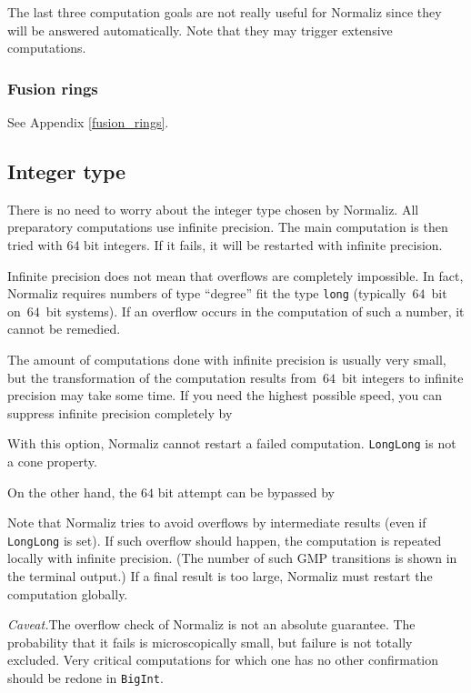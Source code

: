 The last three computation goals are not really useful for Normaliz since they will be answered automatically. Note that they may trigger extensive computations.

\subsubsection{Fusion rings}

See Appendix \ref{fusion_rings}.

\subsection{Integer type}\label{Integer}

There is no need to worry about the integer type chosen by Normaliz. All preparatory computations use infinite precision. The main computation is then tried with $64$ bit integers. If it fails, it will be restarted with infinite precision.

Infinite precision does not mean that overflows are completely impossible. In fact, Normaliz requires numbers of type ``degree'' fit the type \verb|long| (typically~$64$~bit on~$64$~bit systems). If an overflow occurs in the computation of such a number, it cannot be remedied.

The amount of computations done with infinite precision is usually very small, but the transformation of the computation results from~$64$~bit integers to infinite precision may take some time. If you need the highest possible speed, you can suppress infinite precision completely by
\begin{itemize}
	\itemtt[LongLong]
\end{itemize}
With this option, Normaliz cannot restart a failed computation. \verb|LongLong| is not a cone property.

On the other hand, the $64$ bit attempt can be bypassed by
\begin{itemize}
	\itemtt[BigInt, -B]
\end{itemize}

Note that Normaliz tries to avoid overflows by intermediate results (even if \verb|LongLong| is set). If such overflow should happen, the computation is repeated locally with infinite precision. (The number of such GMP transitions is shown in the terminal output.) If a final result is too large, Normaliz must restart the computation globally.

\emph{Caveat.}\enspace The overflow check of Normaliz is not an absolute guarantee. The probability that it fails is microscopically small, but failure is not totally excluded. Very critical computations for which one has no other confirmation should be redone in \verb|BigInt|.

